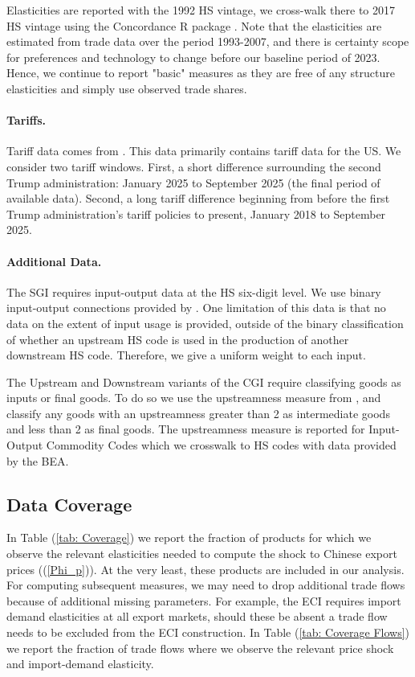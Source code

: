 \documentclass[english,12pt]{article}
\theoremstyle{definition}
\let\oldref\ref
\renewcommand{\ref}[1]{(\oldref{#1})}
\begin{document}
Elasticities are reported with the 1992 HS vintage, we cross-walk there to 2017 HS vintage using the Concordance R package \citep{HSconcordance}. Note that the \cite{soderbery2018trade} elasticities are estimated from trade data over the period 1993-2007, and there is certainty scope for preferences and technology to change before our baseline period of 2023. Hence, we continue to report "basic" measures as they are free of any structure elasticities and simply use observed trade shares. 

\paragraph{Tariffs.}

Tariff data comes from \cite{rodriguez2025}. This data primarily contains tariff data for the US. We consider two tariff windows. First, a short difference surrounding the second Trump administration: January 2025 to September 2025 (the final period of available data). Second, a long tariff difference beginning from before the first Trump administration's tariff policies to present, January 2018 to September 2025. 

\paragraph{Additional Data.}

The SGI requires input-output data at the HS six-digit level. We use binary input-output connections provided by \cite{AIPNET}. One limitation of this data is that no data on the extent of input usage is provided, outside of the binary classification of whether an upstream HS code is used in the production of another downstream HS code. Therefore, we give a uniform weight to each input. 

The Upstream and Downstream variants of the CGI require classifying goods as inputs or final goods. To do so we use the upstreamness measure from \cite{antras2012measuring}, and classify any goods with an upstreamness greater than 2 as intermediate goods and less than 2 as final goods. The upstreamness measure is reported for Input-Output Commodity Codes which we crosswalk to HS codes with data provided by the BEA. 

\subsection{Data Coverage}

In Table \ref{tab: Coverage} we report the fraction of products for which we observe the relevant elasticities needed to compute the shock to Chinese export prices (\ref{Phi_p}). At the very least, these products are included in our analysis. For computing subsequent measures, we may need to drop additional trade flows because of additional missing parameters. For example, the ECI requires import demand elasticities at all export markets, should these be absent a trade flow needs to be excluded from the ECI construction. In Table \ref{tab: Coverage Flows} we report the fraction of trade flows where we observe the relevant price shock and import-demand elasticity. 
\end{document}
